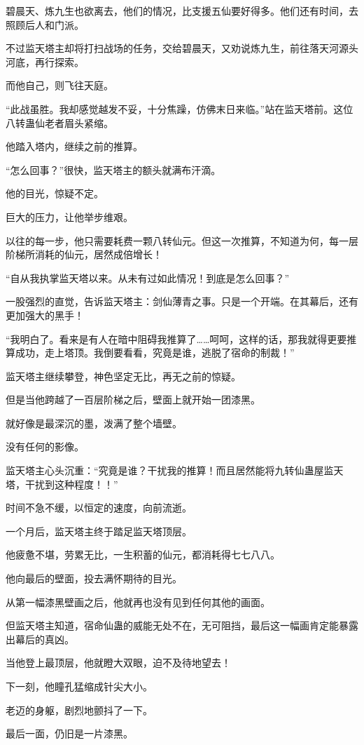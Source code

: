 \begin{this_body}
碧晨天、炼九生也欲离去，他们的情况，比支援五仙要好得多。他们还有时间，去照顾后人和门派。

不过监天塔主却将打扫战场的任务，交给碧晨天，又劝说炼九生，前往落天河源头河底，再行探索。

而他自己，则飞往天庭。

“此战虽胜。我却感觉越发不妥，十分焦躁，仿佛末日来临。”站在监天塔前。这位八转蛊仙老者眉头紧缩。

他踏入塔内，继续之前的推算。

“怎么回事？”很快，监天塔主的额头就满布汗滴。

他的目光，惊疑不定。

巨大的压力，让他举步维艰。

以往的每一步，他只需要耗费一颗八转仙元。但这一次推算，不知道为何，每一层阶梯所消耗的仙元，居然成倍增长！

“自从我执掌监天塔以来。从未有过如此情况！到底是怎么回事？”

一股强烈的直觉，告诉监天塔主：剑仙薄青之事。只是一个开端。在其幕后，还有更加强大的黑手！

“我明白了。看来是有人在暗中阻碍我推算了……呵呵，这样的话，那我就得更要推算成功，走上塔顶。我倒要看看，究竟是谁，逃脱了宿命的制裁！”

监天塔主继续攀登，神色坚定无比，再无之前的惊疑。

但是当他跨越了一百层阶梯之后，壁面上就开始一团漆黑。

就好像是最深沉的墨，泼满了整个墙壁。

没有任何的影像。

监天塔主心头沉重：“究竟是谁？干扰我的推算！而且居然能将九转仙蛊屋监天塔，干扰到这种程度！！”

时间不急不缓，以恒定的速度，向前流逝。

一个月后，监天塔主终于踏足监天塔顶层。

他疲惫不堪，劳累无比，一生积蓄的仙元，都消耗得七七八八。

他向最后的壁面，投去满怀期待的目光。

从第一幅漆黑壁画之后，他就再也没有见到任何其他的画面。

但监天塔主知道，宿命仙蛊的威能无处不在，无可阻挡，最后这一幅画肯定能暴露出幕后的真凶。

当他登上最顶层，他就瞪大双眼，迫不及待地望去！

下一刻，他瞳孔猛缩成针尖大小。

老迈的身躯，剧烈地颤抖了一下。

最后一面，仍旧是一片漆黑。


\end{this_body}
